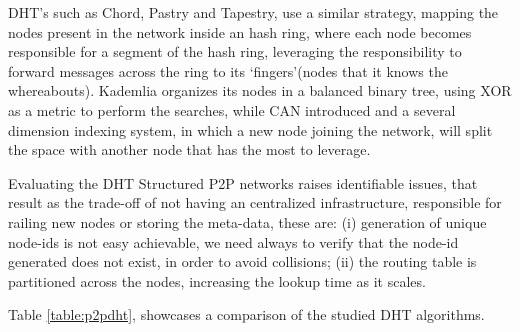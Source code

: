 DHT's such as Chord\cite{Stoica2001}, Pastry\cite{Rowstron2001} and Tapestry\cite{Zhao2001}, use a similar strategy, mapping the nodes present in the network inside an hash ring, where each node becomes responsible for a segment of the hash ring, leveraging the responsibility to forward messages across the ring to its `fingers'(nodes that it knows the whereabouts). Kademlia\cite{Maymounkov} organizes its nodes in a balanced binary tree, using XOR as a metric to perform the searches, while CAN\cite{Handley} introduced and a several dimension indexing system, in which a new node joining the network, will split the space with another node that has the most to leverage.

Evaluating the DHT Structured P2P networks raises identifiable issues, that result as the trade-off of not having an centralized infrastructure, responsible for railing new nodes or storing the meta-data, these are: (i) generation of unique node-ids is not easy achievable, we need always to verify that the node-id generated does not exist, in order to avoid collisions; (ii) the routing table is partitioned across the nodes, increasing the lookup time as it scales.

Table \ref{table:p2pdht}, showcases a comparison of the studied DHT algorithms.


